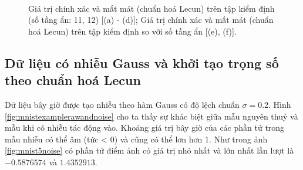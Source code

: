 \begin{figure}[ht!]
\begin{center}
{        }\\
%
    \end{center}
    \caption{%
        Giá trị chính xác và mất mát (chuẩn hoá Lecun) trên tập kiểm định (số tầng ẩn: 11, 12) [(a) - (d)]; Giá trị chính xác và mất mát (chuẩn hoá Lecun) trên tập kiểm định so với số tầng ẩn [(e), (f)].
     }%
   \label{fig:mnistd4}
\end{figure}

\clearpage

\subsection{Dữ liệu có nhiễu Gauss và khởi tạo trọng số theo chuẩn hoá Lecun}\label{subsec:mnistnoise}

Dữ liệu bây giờ được tạo nhiễu theo hàm Gauss có độ lệch chuẩn $\sigma = 0.2$.
Hình \ref{fig:mnistexamplerawandnoise} cho ta thấy sự khác biệt giữa mẫu nguyên thuỷ và mẫu khi có nhiễu tác động vào.
Khoảng giá trị bây giờ của các phần tử trong mẫu nhiễu có thể âm (tức < 0) và cũng có thể lơn hơn 1.
Như trong ảnh \ref{fig:mnist5noise} có phần tử điểm ảnh có giá trị nhỏ nhất và lớn nhất lần lượt là $-0.5876574$ và $1.4352913$.

